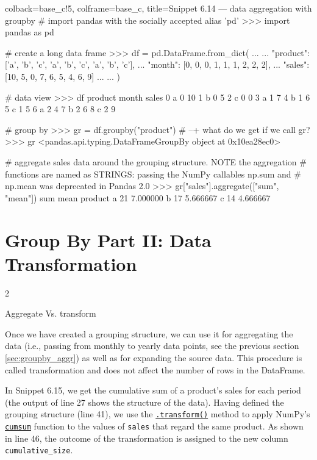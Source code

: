 \documentclass[a4paper,11pt]{book}
\newcommand{\question}[1]{%
    \begin{tcolorbox}[colback=comp_c!10,colframe=comp_c,sidebyside align=top,width=\linewidth,before skip=1ex]
        #1
    \end{tcolorbox}
    \switchcolumn%
}
\newcommand{\note}[1]{%
    \begin{tcolorbox}[colback=white!0,colframe=white!10,width=\linewidth,before skip=1ex]
        #1
    \end{tcolorbox}
}
\begin{document}
\begin{pythoncode}[linenos=True]{colback=base_c!5, colframe=base_c, title=\sffamily Snippet 6.14 --- data aggregation with groupby}
# import pandas with the socially accepted alias 'pd'
>>> import pandas as pd

# create a long data frame
>>> df = pd.DataFrame.from_dict(
...     {
...         "product": ['a', 'b', 'c', 'a', 'b', 'c', 'a', 'b', 'c'],
...         "month": [0, 0, 0, 1, 1, 1, 2, 2, 2],
...         "sales": [10,  5,  0,  7,  6,  5,  4,  6,  9]
...     }
...     )

# data view
>>> df
  product  month  sales
0       a      0     10
1       b      0      5
2       c      0      0
3       a      1      7
4       b      1      6
5       c      1      5
6       a      2      4
7       b      2      6
8       c      2      9

# group by
>>> gr = df.groupby("product")
# --+ what do we get if we call gr?
>>> gr
<pandas.api.typing.DataFrameGroupBy object at 0x10ea28ec0>

# aggregate sales data around the grouping structure. NOTE the aggregation
# functions are named as STRINGS: passing the NumPy callables np.sum and
# np.mean was deprecated in Pandas 2.0
>>> gr["sales"].aggregate(["sum", "mean"])
         sum      mean
product               
a         21  7.000000
b         17  5.666667
c         14  4.666667
\end{pythoncode}
\clearpage
\section{Group By Part II: Data Transformation}
\label{sec:groupby_transform}

\begin{paracol}{2}
	\question{\raggedright Aggregate Vs. transform}
	\note{Once we have created a grouping structure, we can use it for aggregating the data (i.e., passing from monthly to yearly data points, see the previous section \ref{sec:groupby_aggr}) as well as for expanding the source data. This procedure is called transformation and does not affect the number of rows in the DataFrame.
	
	\quad In Snippet 6.15, we get the cumulative sum of a product's sales for each period (the output of line 27 shows the structure of the data). Having defined the grouping structure (line 41), we use the \href{https://pandas.pydata.org/docs/reference/api/pandas.DataFrame.transform.html?highlight=transform\#pandas.DataFrame.transform}{\texttt{.transform()}} method to apply NumPy's \href{https://numpy.org/doc/stable/reference/generated/numpy.cumsum.html}{\texttt{cumsum}} function to the values of \texttt{sales} that regard the same product. As shown in line 46, the outcome of the transformation is assigned to the new column \texttt{cumulative\_size}.
	}
\end{paracol}
\end{document}
